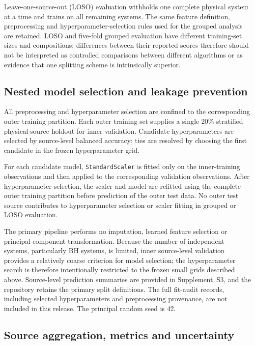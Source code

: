 \documentclass[final,5p,authoryear,nopreprintline]{elsarticle}
\begin{document}
Leave-one-source-out (LOSO) evaluation withholds one complete physical system at a time and trains on all remaining systems. The same feature definition, preprocessing and hyperparameter-selection rules used for the grouped analysis are retained. LOSO and five-fold grouped evaluation have different training-set sizes and compositions; differences between their reported scores therefore should not be interpreted as controlled comparisons between different algorithms or as evidence that one splitting scheme is intrinsically superior.

\subsection{Nested model selection and leakage prevention}

All preprocessing and hyperparameter selection are confined to the corresponding outer training partition. Each outer training set supplies a single 20\% stratified physical-source holdout for inner validation. Candidate hyperparameters are selected by source-level balanced accuracy; ties are resolved by choosing the first candidate in the frozen hyperparameter grid.

For each candidate model, \texttt{StandardScaler} is fitted only on the inner-training observations and then applied to the corresponding validation observations. After hyperparameter selection, the scaler and model are refitted using the complete outer training partition before prediction of the outer test data. No outer test source contributes to hyperparameter selection or scaler fitting in grouped or LOSO evaluation.

The primary pipeline performs no imputation, learned feature selection or principal-component transformation. Because the number of independent systems, particularly BH systems, is limited, inner source-level validation provides a relatively coarse criterion for model selection; the hyperparameter search is therefore intentionally restricted to the frozen small grids described above. Source-level prediction summaries are provided in Supplement~S3, and the repository retains the primary split definitions. The full fit-audit records, including selected hyperparameters and preprocessing provenance, are not included in this release. The principal random seed is 42.

\subsection{Source aggregation, metrics and uncertainty}
\end{document}
